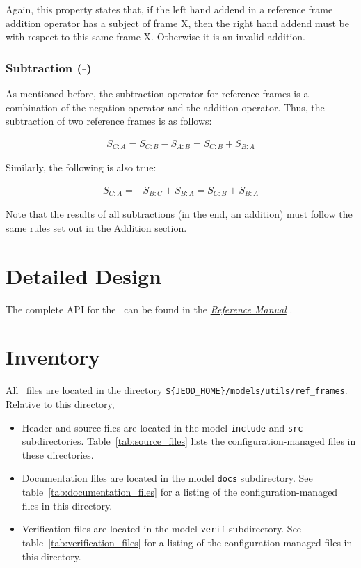 Again, this property states that, if the left hand addend in a reference
frame addition operator has a subject of frame X, then the right
hand addend must be with respect to this same frame X. Otherwise
it is an invalid addition.

\subsubsection{Subtraction (-)}

As mentioned before, the subtraction operator for reference frames
is a combination of the negation operator and the addition operator.
Thus, the subtraction of two reference frames is as follows:

\begin{gather}\label{simple_subtraction_right}
S_{C:A} = S_{C:B} - S_{A:B} = S_{C:B} + S_{B:A}
\end{gather}

Similarly, the following is also true:

\begin{gather}\label{simple_subtraction_left}
S_{C:A} = -S_{B:C} + S_{B:A} = S_{C:B} + S_{B:A}
\end{gather}

Note that the results of all subtractions (in the end, an addition) must
follow the same rules set out in the Addition section.

\section{Detailed Design}

The complete API for the \ can be found
in the \href{file:refman.pdf} {\em Reference Manual}
\cite{refframesbib:ReferenceManual}.

\section{Inventory}
All \ files are located in the directory \newline
{\tt \$\{JEOD\_HOME\}/models/utils/ref\_frames}.
Relative to this directory,
\begin{itemize}
\vspace{-0.2\baselineskip}
\item Header and source files are located
in the model {\tt include} and {\tt src} subdirectories.
Table~\ref{tab:source_files} lists the
configuration-managed files in these directories.
\vspace{-0.1\baselineskip}
\item Documentation files are located in the model {\tt docs} subdirectory.
See table~\ref{tab:documentation_files}
for a listing of the
configuration-managed files in this directory.
\vspace{-0.1\baselineskip}
\item Verification files are located in the model {\tt verif} subdirectory.
See table~\ref{tab:verification_files}
for a listing of the
configuration-managed files in this directory.
\end{itemize}

